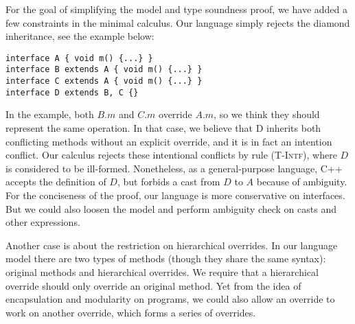 For the goal of simplifying the model and type soundness proof, we have added a few constraints in the minimal calculus. Our language simply rejects the diamond inheritance, see the example below:

\vspace{3pt}\begin{lstlisting}
interface A { void m() {...} }
interface B extends A { void m() {...} }
interface C extends A { void m() {...} }
interface D extends B, C {}
\end{lstlisting}\vspace{3pt}
In the example, both $B.m$ and $C.m$ override $A.m$, so we think they should represent the same operation. In that case, we believe that D inherits
both conflicting methods without an explicit override, and it is in fact an intention conflict. Our calculus rejects these intentional conflicts by rule \textsc{(T-Intf)}, where $D$ is considered to be ill-formed. Nonetheless, as a general-purpose language, C++ accepts the definition of $D$, but forbids a cast from $D$ to $A$ because of ambiguity. For the conciseness of the proof, our language is more conservative on interfaces.
But we could also loosen the model and perform ambiguity check on casts and other expressions.

Another case is about the restriction on hierarchical overrides. In our language model there are two types of methods (though they share the same syntax): original methods and hierarchical overrides. We require that a hierarchical override should only override an original method. Yet from the idea of encapsulation and modularity on programs, we could also allow an override to work on another override, which forms a series of overrides.

